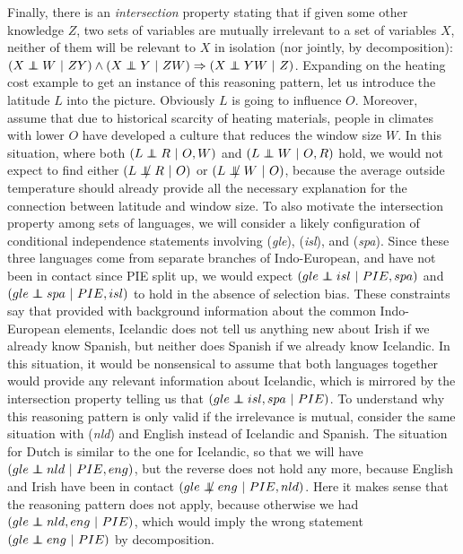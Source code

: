 Finally, there is an \textit{intersection} property stating that if given some other knowledge $Z$, two sets of variables are mutually irrelevant to a set of variables $X$, neither of them will be relevant to $X$ in isolation (nor jointly, by decomposition): $(X \independent W\ |\ ZY)  \wedge (X \independent Y\ |\ ZW) \Rightarrow (X \independent YW\ |\ Z)$. Expanding on the heating cost example to get an instance of this reasoning pattern, let us introduce the latitude $L$ into the picture. Obviously $L$ is going to influence $O$. Moreover, assume that due to historical scarcity of heating materials, people in climates with lower $O$ have developed a culture that reduces the window size $W$. In this situation, where both $(L \independent R\ |\ O, W)$ and $(L \independent W\ |\ O, R)$ hold, we would not expect to find either $(L \notindep R\ |\ O)$ or $(L \notindep W\ |\ O)$, because the average outside temperature should already provide all the necessary explanation for the connection 
between latitude and window size. To also motivate the intersection property among sets of languages, we will consider a likely configuration of conditional independence statements involving  (\textit{gle}),  (\textit{isl}), and  (\textit{spa}). Since these three languages come from separate branches of Indo-European, and have not been in contact since PIE split up, we would expect $(gle \independent isl\ |\ PIE, spa)$ and $(gle \independent spa\ |\ PIE, isl)$ to hold in the absence of selection bias. These constraints say that provided with background information about the common Indo-European elements, Icelandic does not tell us anything new about Irish if we already know Spanish, but neither does Spanish if we already know Icelandic. In this situation, it would be nonsensical to assume that both languages together would provide any relevant information about Icelandic, which is mirrored by the intersection property telling us that $(gle \independent isl, spa\ |\ PIE)
$. To understand why this reasoning pattern is only valid if the irrelevance is mutual, consider the same situation with  (\textit{nld}) and English instead of Icelandic and Spanish. The situation for Dutch is similar to the one for Icelandic, so that we will have $(gle \independent nld\ |\ PIE, eng)$, but the reverse does not hold any more, because English and Irish have been in contact $(gle \notindep eng\ |\ PIE, nld)$.  Here it makes sense that the reasoning pattern does not apply, because otherwise we had $(gle \independent nld, eng\ |\ PIE)$, which would imply the wrong statement $(gle \independent eng\ |\ PIE)$ by decomposition.

